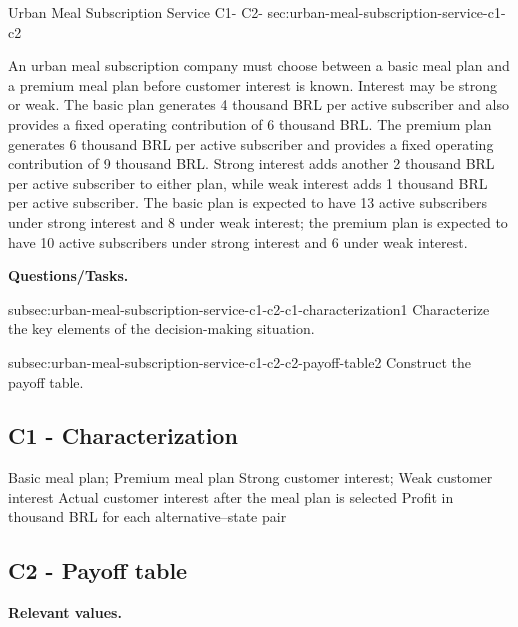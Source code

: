 	\sectionScored
	{Urban Meal Subscription Service}
	{C1- \hspace{2mm} C2-}
	{sec:urban-meal-subscription-service-c1-c2}
	{
		An urban meal subscription company must choose between a basic meal plan and a premium meal plan before customer interest is known. Interest may be strong or weak. The basic plan generates 4 thousand BRL per active subscriber and also provides a fixed operating contribution of 6 thousand BRL. The premium plan generates 6 thousand BRL per active subscriber and provides a fixed operating contribution of 9 thousand BRL. Strong interest adds another 2 thousand BRL per active subscriber to either plan, while weak interest adds 1 thousand BRL per active subscriber. The basic plan is expected to have 13 active subscribers under strong interest and 8 under weak interest; the premium plan is expected to have 10 active subscribers under strong interest and 6 under weak interest.
		
		\textbf{Questions/Tasks.}
		\begin{enumerate}
			\CriterionTask
			{subsec:urban-meal-subscription-service-c1-c2-c1-characterization}{1}
			{Characterize the key elements of the decision-making situation. }
			
			\CriterionTask
			{subsec:urban-meal-subscription-service-c1-c2-c2-payoff-table}{2}
			{Construct the payoff table. }
		\end{enumerate}
		
		\label{subsec:urban-meal-subscription-service-c1-c2-c1-characterization}
		\subsection*{C1 - Characterization }
		
		\DecisionElementsTable
		{Basic meal plan; Premium meal plan}
		{Strong customer interest; Weak customer interest}
		{Actual customer interest after the meal plan is selected}
		{Profit in thousand BRL for each alternative--state pair}
		
		\label{subsec:urban-meal-subscription-service-c1-c2-c2-payoff-table}
		\subsection*{C2 - Payoff table }
		
		\textbf{Relevant values.}
		
}
